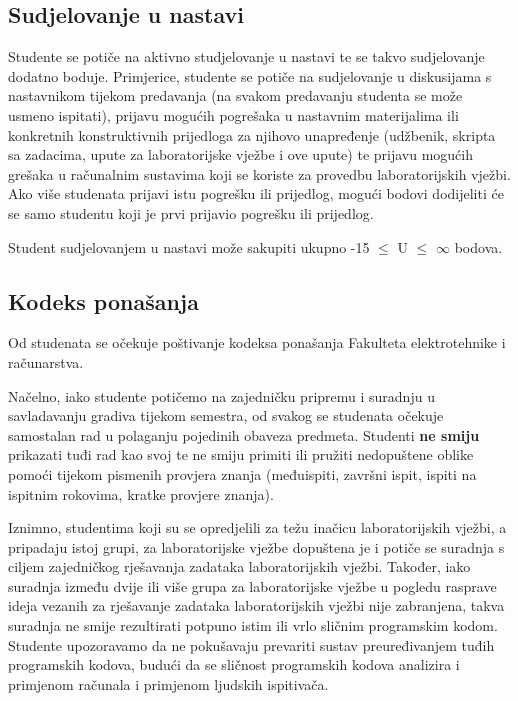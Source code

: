 \documentclass[times, 12pt, utf8]{book}
\begin{document}
\cleardoublepage  
{}  
{}
\subsection*{Sudjelovanje u nastavi}

Studente se potiče na aktivno studjelovanje u nastavi te se takvo sudjelovanje dodatno boduje.
Primjerice, studente se potiče na sudjelovanje u diskusijama s nastavnikom tijekom predavanja (na svakom predavanju studenta se može usmeno ispitati), prijavu mogućih pogrešaka u nastavnim materijalima ili konkretnih konstruktivnih prijedloga za njihovo unapređenje (udžbenik, skripta sa zadacima, upute za laboratorijske vježbe i ove upute) te prijavu mogućih grešaka u računalnim sustavima koji se koriste za provedbu laboratorijskih vježbi.
Ako više studenata prijavi istu pogrešku ili prijedlog, mogući bodovi dodijeliti će se samo studentu koji je prvi prijavio pogrešku ili prijedlog.

Student sudjelovanjem u nastavi može sakupiti ukupno -15 $\leq$ U $\leq$ $\infty$ bodova.

\cleardoublepage  
{}  
{}
\subsection*{Kodeks ponašanja}

Od studenata se očekuje poštivanje kodeksa ponašanja Fakulteta elektrotehnike i računarstva.

Načelno, iako studente potičemo na zajedničku pripremu i suradnju u savladavanju gradiva tijekom semestra, od svakog se studenata očekuje samostalan rad u polaganju pojedinih obaveza predmeta.
Studenti \textbf{ne smiju} prikazati tuđi rad kao svoj te ne smiju primiti ili pružiti nedopuštene oblike pomoći tijekom pismenih provjera znanja (međuispiti, završni ispit, ispiti na ispitnim rokovima, kratke provjere znanja). 

Iznimno, studentima koji su se opredjelili za težu inačicu laboratorijskih vježbi, a pripadaju istoj grupi,  za laboratorijske vježbe dopuštena je i potiče se suradnja s ciljem zajedničkog rješavanja zadataka laboratorijskih vježbi.
Također, iako suradnja između dvije ili više grupa za laboratorijske vježbe u pogledu rasprave ideja vezanih za rješavanje zadataka laboratorijskih vježbi nije zabranjena, takva suradnja ne smije rezultirati potpuno istim ili vrlo sličnim programskim kodom.
Studente upozoravamo da ne pokušavaju prevariti sustav preuređivanjem tuđih programskih kodova, budući da se sličnost programskih kodova analizira i primjenom računala i primjenom ljudskih ispitivača.
\end{document}
